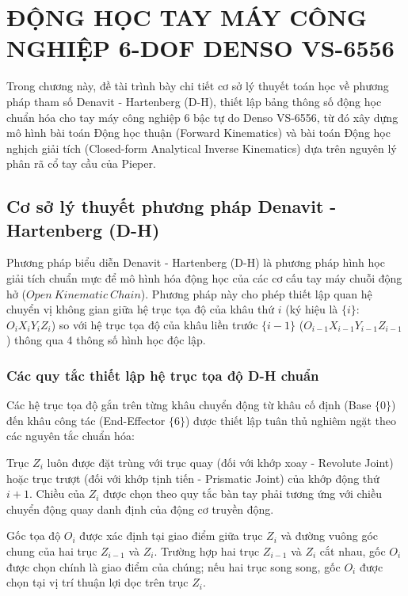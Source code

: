 \chapter{ĐỘNG HỌC TAY MÁY CÔNG NGHIỆP 6-DOF DENSO VS-6556}
\label{chap:dong_hoc_denso}

Trong chương này, đề tài trình bày chi tiết cơ sở lý thuyết toán học về phương pháp tham số Denavit - Hartenberg (D-H), thiết lập bảng thông số động học chuẩn hóa cho tay máy công nghiệp 6 bậc tự do Denso VS-6556, từ đó xây dựng mô hình bài toán Động học thuận (Forward Kinematics) và bài toán Động học nghịch giải tích (Closed-form Analytical Inverse Kinematics) dựa trên nguyên lý phân rã cổ tay cầu của Pieper.

\section{Cơ sở lý thuyết phương pháp Denavit - Hartenberg (D-H)}
\label{sec:dh_theory}

Phương pháp biểu diễn Denavit - Hartenberg (D-H) là phương pháp hình học giải tích chuẩn mực để mô hình hóa động học của các cơ cấu tay máy chuỗi động hở ($Open\ Kinematic\ Chain$). Phương pháp này cho phép thiết lập quan hệ chuyển vị không gian giữa hệ trục tọa độ của khâu thứ $i$ (ký hiệu là $\{i\}$: $O_i X_i Y_i Z_i$) so với hệ trục tọa độ của khâu liền trước $\{i-1\}$ ($O_{i-1} X_{i-1} Y_{i-1} Z_{i-1}$) thông qua 4 thông số hình học độc lập.

\subsection{Các quy tắc thiết lập hệ trục tọa độ D-H chuẩn}

Các hệ trục tọa độ gắn trên từng khâu chuyển động từ khâu cố định (Base $\{0\}$) đến khâu công tác (End-Effector $\{6\}$) được thiết lập tuân thủ nghiêm ngặt theo các nguyên tắc chuẩn hóa:

Trục $Z_i$ luôn được đặt trùng với trục quay (đối với khớp xoay - Revolute Joint) hoặc trục trượt (đối với khớp tịnh tiến - Prismatic Joint) của khớp động thứ $i+1$. Chiều của $Z_i$ được chọn theo quy tắc bàn tay phải tương ứng với chiều chuyển động quay danh định của động cơ truyền động.

Gốc tọa độ $O_i$ được xác định tại giao điểm giữa trục $Z_i$ và đường vuông góc chung của hai trục $Z_{i-1}$ và $Z_i$. Trường hợp hai trục $Z_{i-1}$ và $Z_i$ cắt nhau, gốc $O_i$ được chọn chính là giao điểm của chúng; nếu hai trục song song, gốc $O_i$ được chọn tại vị trí thuận lợi dọc trên trục $Z_i$.

